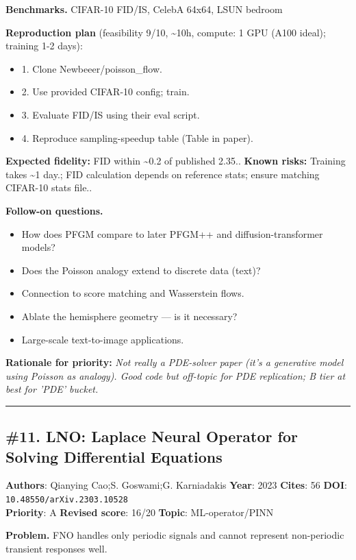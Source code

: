 \documentclass[10pt,letterpaper]{article}
\begin{document}
\textbf{Benchmarks.} CIFAR-10 FID/IS, CelebA 64x64, LSUN bedroom

\textbf{Reproduction plan} (feasibility 9/10, \textasciitilde10h, compute: 1 GPU (A100 ideal); training 1-2 days):
\begin{itemize}
\item 1. Clone Newbeeer/poisson\_flow.
\item 2. Use provided CIFAR-10 config; train.
\item 3. Evaluate FID/IS using their eval script.
\item 4. Reproduce sampling-speedup table (Table in paper).
\end{itemize}
\textbf{Expected fidelity:} FID within \~{}0.2 of published 2.35.. \textbf{Known risks:} Training takes \~{}1 day.; FID calculation depends on reference stats; ensure matching CIFAR-10 stats file..

\textbf{Follow-on questions.}
\begin{itemize}
\item How does PFGM compare to later PFGM++ and diffusion-transformer models?
\item Does the Poisson analogy extend to discrete data (text)?
\item Connection to score matching and Wasserstein flows.
\item Ablate the hemisphere geometry — is it necessary?
\item Large-scale text-to-image applications.
\end{itemize}

\textbf{Rationale for priority:} \emph{Not really a PDE-solver paper (it's a generative model using Poisson as analogy). Good code but off-topic for PDE replication; B tier at best for 'PDE' bucket.}

\medskip\hrule\medskip

\subsection*{\#11. LNO: Laplace Neural Operator for Solving Differential Equations}
\textbf{Authors}: Qianying Cao;S. Goswami;G. Karniadakis \textbullet{} \textbf{Year}: 2023 \textbullet{} \textbf{Cites}: 56 \textbullet{} \textbf{DOI}: \texttt{10.48550/arXiv.2303.10528} \\
\textbf{Priority}: A \textbullet{} \textbf{Revised score}: 16/20 \textbullet{} \textbf{Topic}: ML-operator/PINN

\textbf{Problem.} FNO handles only periodic signals and cannot represent non-periodic transient responses well.
\end{document}
